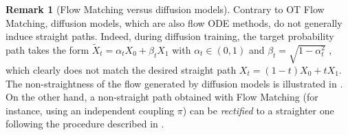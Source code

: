 \documentclass{article} %
\theoremstyle{definition}
\newtheorem{remark}[theorem]{Remark}
\begin{document}
\begin{remark}[Flow Matching versus diffusion models]
Contrary to OT Flow Matching, diffusion models, which are also flow ODE methods, do not generally induce straight paths. Indeed, during diffusion training, the target probability path takes the form $\tilde{X}_t = \alpha_t X_0 + \beta_t X_1$ with $\alpha_t \in (0,1)$ and $\beta_t =\sqrt{1-\alpha_t^2}$ \citep{song2021scorebased, liu2023flow}, which clearly does not match the desired straight path $X_t = (1-t)X_0 + tX_1$. The non-straightness of the flow generated by diffusion models is illustrated in \citet[Figure 5]{liu2023flow,liu2022Ot}. On the other hand, a non-straight path obtained with Flow Matching (for instance, using an independent coupling $\pi$) can be \emph{rectified} to a straighter one following the procedure described in \citet{liu2023flow}.
\end{remark}
\end{document}
